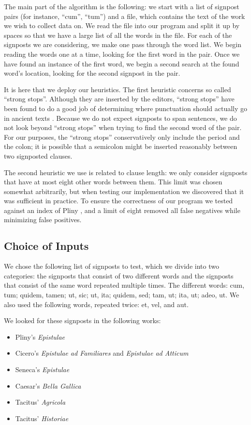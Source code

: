 The main part of the algorithm is the following: we start with a list of signpost pairs (for instance, ``cum'', ``tum'') and a file, which contains the text of the work we wish to collect data on. We read the file into our program and split it up by spaces so that we have a large list of all the words in the file. For each of the signposts we are considering, we make one pass through the word list. We begin reading the words one at a time, looking for the first word in the pair. Once we have found an instance of the first word, we begin a second search at the found word's location, looking for the second signpost in the pair.

It is here that we deploy our heuristics. The first heuristic concerns so called ``strong stops''. Although they are inserted by the editors, ``strong stops'' have been found to do a good job of determining where punctuation should actually go in ancient texts \cite{strongstop}. Because we do not expect signposts to span sentences, we do not look beyond ``strong stops'' when trying to find the second word of the pair. For our purposes, the ``strong stops'' conservatively only include the period and the colon; it is possible that a semicolon might be inserted reasonably between two signposted clauses.

The second heuristic we use is related to clause length: we only consider signposts that have at most eight other words between them. This limit was chosen somewhat arbitrarily, but when testing our implementation we discovered that it was sufficient in practice. To ensure the correctness of our program we tested against an index of Pliny \cite{index}, and a limit of eight removed all false negatives while minimizing false positives.

\subsection{Choice of Inputs}

We chose the following list of signposts to test, which we divide into two categories: the signposts that consist of two different words and the signposts that consist of the same word repeated multiple times. The different words: cum, tum; quidem, tamen; ut, sic; ut, ita; quidem, sed; tam, ut; ita, ut; adeo, ut. We also used the following words, repeated twice: et, vel, and aut.

We looked for these signposts in the following works:
\begin{itemize}
  \item Pliny's \textit{Epistulae}
  \item Cicero's \textit{Epistulae ad Familiares} and \textit{Epistulae ad Atticum}
  \item Seneca's \textit{Epistulae}
  \item Caesar's \textit{Bella Gallica}
  \item Tacitus' \textit{Agricola}
  \item Tacitus' \textit{Historiae}
\end{itemize}

